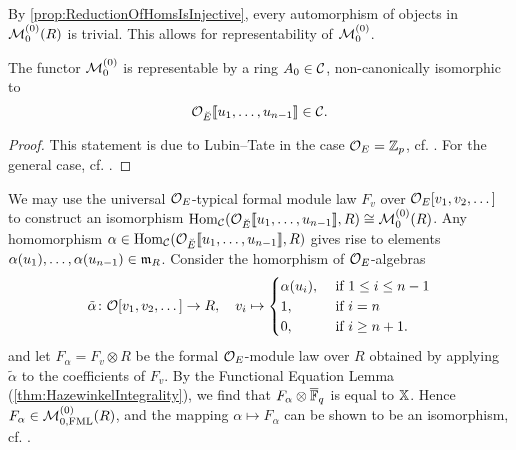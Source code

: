 \documentclass[../main.tex]{subfiles}
\begin{document}
By \cref{prop:ReductionOfHomsIsInjective}, every automorphism of objects in
$\mathcal{M}_{0}^{(0)}(R)$ is trivial. This allows for representability of $\mathcal{M}_{0}^{(0)}$.

\begin{thm}[Representability of $\cM^{(0)}_0$]\label{thm:RepresentabilityOfDefSpaceWOLevel}
  The functor $\mathcal{M}_0^{(0)}$ is representable by a ring $A_0 \in \mathcal{C}$, non-canonically 
  isomorphic to
  \begin{equation*}
    \mathcal{O}_{\breve {E}}\llbracket u_1, \dots, u_{n-1} \rrbracket \in \mathcal{C}.
  \end{equation*}
\begin{proof}
  This statement is due to Lubin--Tate in the case $\mathcal{O}_E = \mathbb{Z}_p$, cf.
  \cite{LubinTate1966FormalModuli}. For the general case, cf. 
  \cite[Proposition 4.2]{drinfel1974elliptic}.
  \end{proof}
\end{thm}

We may use the universal $\mathcal{O}_E$-typical formal module law
$F_v$ over $\mathcal{O}_E[ v_1, v_2, \dots ]$ to construct an
isomorphism $\operatorname{Hom}_{\mathcal{C}}(\mathcal{O}_{\breve {E}}\llbracket u_1, \dots, u_{n-1} \rrbracket, R) \cong
\mathcal{M}_0^{(0)}(R)$. Any homomorphism $\alpha \in \operatorname{Hom}_{\mathcal{C}}(\mathcal{O}_{\breve {E}}\llbracket u_1,
\dots, u_{n-1} \rrbracket, R)$ gives rise to elements 
$\alpha(u_1), \dots, \alpha(u_{n-1}) \in \mathfrak{m}_R$.
Consider the homorphism of $\mathcal{O}_E$-algebras
\begin{equation*}
  \tilde \alpha\colon \mathcal{O}[v_1, v_2, \dots] \to R,
  \quad v_i \mapsto \begin{cases}
    \alpha(u_i), &\text{ if } 1 \leq i \leq n-1 \\
    1, &\text{ if } i = n \\
    0, &\text{ if } i \geq n+1.
  \end{cases}
\end{equation*}
and let $F_\alpha = F_v \otimes R$ be the formal $\mathcal{O}_E$-module law over
$R$ obtained by applying $\tilde \alpha$ to the coefficients of $F_v$. 
By the Functional Equation Lemma (\cref{thm:HazewinkelIntegrality}), we find
that $F_\alpha \otimes {\overline{\mathbb{F}}_q}$ is equal to $\mathbb{X}$. Hence 
$F_\alpha \in \mathcal{M}_{0, \text{FML}}^{(0)}(R)$, and the mapping $\alpha \mapsto F_\alpha$
can be shown to be an isomorphism, cf. \cite[ 12]{hopkins1994equivariant}. 

\end{document}
